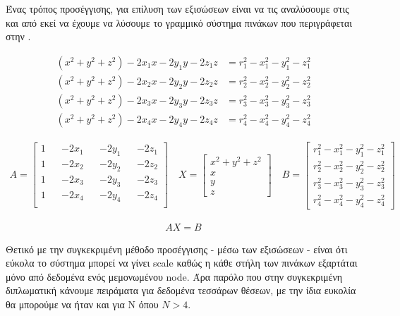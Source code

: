 Ένας τρόπος προσέγγισης, για επίλυση των εξισώσεων  είναι να τις αναλύσουμε στις  
και από εκεί να έχουμε να λύσουμε το γραμμικό σύστημα πινάκων που περιγράφεται στην .

\begin{align}
	(x^2+y^2+z^2) - 2x_1x - 2y_1y - 2z_1z &= r_1^2 - x_1^2 - y_1^2 - z_1^2 \label{eq:multilateration-pha2} \\ 
	(x^2+y^2+z^2) - 2x_2x - 2y_2y - 2z_2z &= r_2^2 - x_2^2 - y_2^2 - z_2^2 \nonumber \\
	(x^2+y^2+z^2) - 2x_3x - 2y_3y - 2z_3z &= r_3^2 - x_3^2 - y_3^2 - z_3^2 \nonumber \\
	(x^2+y^2+z^2) - 2x_4x - 2y_4y - 2z_4z &= r_4^2 - x_4^2 - y_4^2 - z_4^2 \nonumber
\end{align}


\begin{align}
	A = \begin{bmatrix} 1 && -2x_1 && -2y_1 && -2z_1 \\ 1 && -2x_2 && -2y_2 && -2z_2 \\ 1 && -2x_3 && -2y_3 && -2z_3 \\ 1 && -2x_4 && -2y_4 && -2z_4 \\\end{bmatrix} \nonumber \quad
	X = \begin{bmatrix} x^2+y^2+z^2 \\x \\ y \\ z \end{bmatrix} \nonumber \quad
	B = \begin{bmatrix} r_1^2 - x_1^2 - y_1^2 - z_1^2 \\ r_2^2 - x_2^2 - y_2^2 - z_2^2 \\ r_3^2 - x_3^2 - y_3^2 - z_3^2 \\ r_4^2 - x_4^2 - y_4^2 - z_4^2 \end{bmatrix} \nonumber
\end{align}

\begin{align}
	AX = B \label{eq:multilateration-linear-system}
\end{align}

Θετικό με την συγκεκριμένη μέθοδο προσέγγισης - μέσω των εξισώσεων  - είναι ότι εύκολα το σύστημα μπορεί να γίνει scale καθώς η κάθε στήλη των πινάκων εξαρτάται μόνο από δεδομένα ενός μεμονωμένου node. Άρα παρόλο που στην συ\-γκε\-κρι\-μένη διπλωματική κάνουμε πειράματα για δεδομένα τεσσάρων θέσεων, με την ίδια ευκολία θα μπορούμε να ήταν και για N όπου $N>4$.

